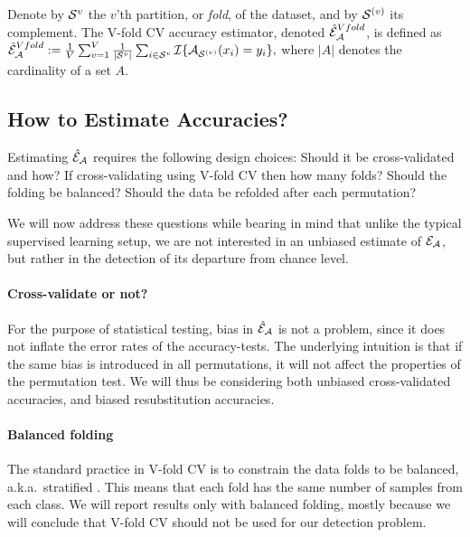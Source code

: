 \documentclass[oupdraft]{bio}
\begin{document}
\begin{definition}
	\label{def:v-fold}
	Denote by $\mathcal{S}^{v}$ the $v$'th partition, or \emph{fold}, of the dataset, and by $\mathcal{S}^{(v)}$ its complement.
	The V-fold CV accuracy estimator, denoted $\hat{\mathcal{E}}_{\mathcal{A}}^{Vfold}$, is defined as 	
	$\hat{\mathcal{E}}_{\mathcal{A}}^{Vfold} := 
	\frac 1V \sum_{v=1}^{V} \frac{1}{|\mathcal{S}^v|} \sum_{i \in \mathcal{S}^{v}} \mathcal{I}{\{ \mathcal{A}_{\mathcal{S}^{(v)}}(x_i)=y_i \}},$
	where $|A|$ denotes the cardinality of a set $A$.
\end{definition}




\subsection{How to Estimate Accuracies?}
\label{sec:considerations}

Estimating $\hat{\mathcal{E}}_{\mathcal{A}}$ requires the following design choices: 
Should it be cross-validated and how? 
If cross-validating using V-fold CV then how many folds? 
Should the folding be balanced?
Should the data be refolded after each permutation? 

We will now address these questions while bearing in mind that unlike the typical supervised learning setup, we are not interested in an unbiased estimate of $\mathcal{E}_{\mathcal{A}}$, but rather in the detection of its departure from chance level. 

\paragraph{Cross-validate or not?}
For the purpose of statistical testing, bias in $\hat{\mathcal{E}}_{\mathcal{A}}$ is not a problem, since  it does not inflate the error rates of the accuracy-tests. 
The underlying intuition is that if the same bias is introduced in all permutations, it will not affect the properties of the permutation test. 
We will thus be considering both unbiased cross-validated accuracies, and biased resubstitution accuracies.


\paragraph{Balanced folding}
The standard practice in V-fold CV is to constrain the data folds to be balanced, a.k.a.\ stratified \cite[for example]{ojala_permutation_2010}.
This means that each fold has the same number of samples from each class. 
We will report results only with balanced folding, mostly because we will conclude that V-fold CV should not be used for our detection problem. 
\end{document}
